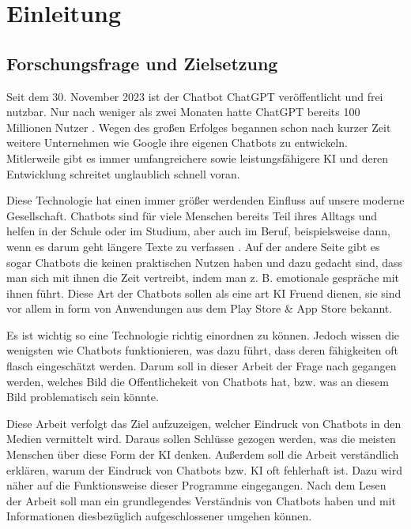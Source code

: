 \section{Einleitung}
	\subsection{Forschungsfrage und Zielsetzung}
	Seit dem 30. November 2023 ist der Chatbot ChatGPT veröffentlicht und frei nutzbar. 
	Nur nach weniger als zwei Monaten hatte ChatGPT bereits 100 Millionen Nutzer \cite[S. 15]{spitzer23}.
	Wegen des großen Erfolges begannen schon nach kurzer Zeit weitere Unternehmen wie Google ihre eigenen 
	Chatbots zu entwickeln. Mitlerweile gibt es immer umfangreichere sowie leistungsfähigere KI und
	deren Entwicklung schreitet unglaublich schnell voran.
	
	Diese Technologie hat einen immer größer werdenden Einfluss auf unsere moderne Gesellschaft. 
	Chatbots sind für viele Menschen bereits Teil ihres Alltags und helfen in der Schule oder
	im Studium, aber auch im Beruf, beispielsweise dann, wenn es darum geht längere Texte zu verfassen \cite[S. 175, S. 185]{shaji23}.
	Auf der andere Seite gibt es sogar Chatbots die keinen praktischen Nutzen haben und dazu gedacht
	sind, dass man sich mit ihnen die Zeit vertreibt, indem man z. B. emotionale gespräche mit ihnen 
	führt. Diese Art der Chatbots sollen als eine art KI Fruend dienen, sie sind vor allem in form
	von Anwendungen aus dem Play Store \& App Store bekannt.
	
	Es ist wichtig so eine Technologie richtig einordnen zu können. Jedoch wissen die wenigsten
	wie Chatbots funktionieren, was dazu führt, dass deren fähigkeiten oft flasch eingeschätzt werden. 
	Darum soll in dieser Arbeit der Frage nach gegangen werden, welches Bild die Offentlichekeit von 
	Chatbots hat, bzw. was an diesem Bild problematisch sein könnte. 

	Diese Arbeit verfolgt das Ziel aufzuzeigen, welcher Eindruck von Chatbots in den Medien   
	vermittelt wird. Daraus sollen Schlüsse gezogen werden, was die meisten Menschen über diese Form 
	der KI denken. Außerdem soll die Arbeit verständlich erklären, warum der Eindruck von
	Chatbots bzw. KI oft fehlerhaft ist. Dazu wird näher auf die Funktionsweise dieser Programme 
	eingegangen. Nach dem Lesen der Arbeit soll man ein grundlegendes Verständnis von Chatbots haben 
	und mit Informationen diesbezüglich aufgeschlossener umgehen können. 

	\clearpage
